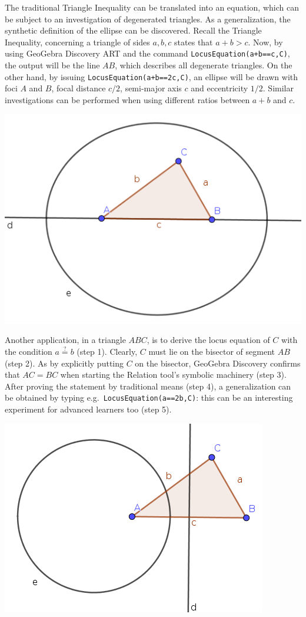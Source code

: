 \documentclass{article}
\begin{document}
The traditional Triangle Inequality can be translated into an equation, which can be subject to an investigation of degenerated triangles. As a generalization, the synthetic definition of the ellipse can be discovered.
Recall the Triangle Inequality, concerning a triangle of sides $a,b,c$  states that $a+b>c$. Now,  by using GeoGebra Discovery ART and the command
\texttt{LocusEquation(a+b==c,C)},  the output will be the line $AB$,  which
describes all degenerate triangles. On the other hand, by issuing \texttt{LocusEquation(a+b==2c,C)},
an ellipse will be drawn with foci $A$ and $B$, focal distance $c/2$, semi-major axis $c$
and eccentricity $1/2$. Similar investigations can be performed when using different
ratios between $a+b$ and $c$.
\begin{center}
\includegraphics[scale=0.5]{further1}
\end{center}

Another application, in a triangle $ABC$, is to derive the locus equation
of $C$ with the condition $a\stackrel{?}{=}b$ (step 1). Clearly, $C$ must
lie on the bisector of segment $AB$ (step 2). As  by explicitly putting
$C$ on the bisector, GeoGebra Discovery confirms that $AC=BC$ when starting the
Relation tool's symbolic machinery (step 3). After proving the statement
by traditional means (step 4), a generalization can be obtained by typing
e.g.~\texttt{LocusEquation(a==2b,C)}: this can be an interesting
experiment for advanced learners too (step 5).
\begin{center}
\includegraphics[scale=0.5]{further2}
\end{center}
\end{document}
